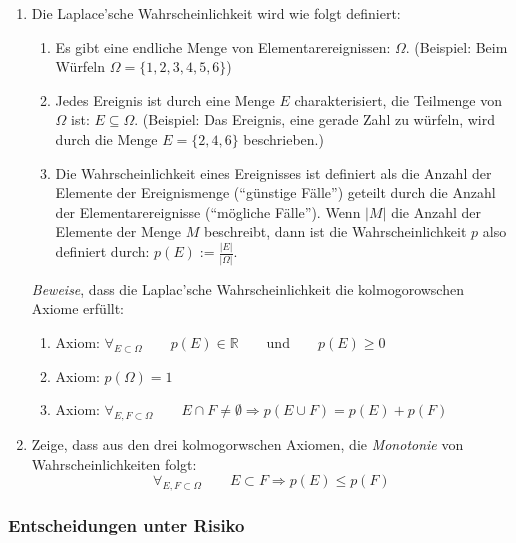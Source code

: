 \begin{enumerate}
  \item Die Laplace'sche Wahrscheinlichkeit wird wie folgt definiert:
  \begin{enumerate}
    \item Es gibt eine endliche Menge von Elementarereignissen: $\Omega$.
    (Beispiel: Beim Würfeln $\Omega = \{1,2,3,4,5,6\}$)
    \item Jedes Ereignis ist durch eine Menge $E$ charakterisiert, die
    Teilmenge von $\Omega$ ist: $E \subseteq \Omega$. (Beispiel: Das Ereignis,
    eine gerade Zahl zu würfeln, wird durch die Menge
    $E=\{2,4,6\}$ beschrieben.)
    \item Die Wahrscheinlichkeit eines Ereignisses ist definiert als die Anzahl
    der Elemente der Ereignismenge ("`günstige Fälle"') geteilt
    durch die Anzahl der Elementarereignisse ("`mögliche Fälle"'). Wenn $|M|$
    die Anzahl der Elemente der Menge $M$ beschreibt, dann ist die
    Wahrscheinlichkeit $p$ also definiert durch: $p(E) := \frac{|E|}{|\Omega|}$.
  \end{enumerate}
  {\em Beweise}, dass die Laplac'sche Wahrscheinlichkeit die kolmogorowschen
  Axiome erfüllt:
  \begin{enumerate}
    \item Axiom: $\forall_{E \subset \Omega} \qquad p(E) \in \mathbb{R} \qquad
    \mbox{und} \qquad p(E) \geq 0$
    \item Axiom: $p(\Omega) = 1$
    \item Axiom: $\forall_{E,F \subset \Omega} \qquad E \cap F \neq
    \emptyset \Rightarrow p(E \cup F) = p(E) + p(F)$
  \end{enumerate}   
  
  \item Zeige, dass aus den drei kolmogorwschen Axiomen, die {\em Monotonie}
  von Wahrscheinlichkeiten folgt: 
  \[\forall_{E,F \subset \Omega} \qquad E \subset F \Rightarrow p(E)
 \leq p(F) \]
\end{enumerate}

\subsubsection{Entscheidungen unter Risiko}


